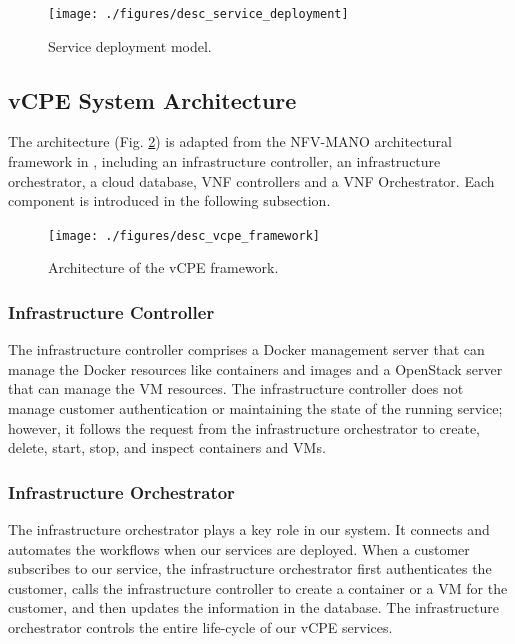 \documentclass[conference]{IEEEtran}
\begin{document}
\begin{figure}[!t]
\centering
\texttt{[image: ./figures/desc\_service\_deployment]}
\caption{Service deployment model.}
\label{fig:desc_service_deployment}
\end{figure}

\subsection{vCPE System Architecture}
The architecture (Fig. \ref{fig:desc_vcpe_framework}) is adapted from the NFV-MANO architectural framework in \cite{nfv2014-v111}, including an infrastructure controller, an infrastructure orchestrator, a cloud database, VNF controllers and a VNF Orchestrator. Each component is introduced in the following subsection.

\begin{figure}[!t]
\centering
\texttt{[image: ./figures/desc\_vcpe\_framework]}
\caption{Architecture of the vCPE framework.}
\label{fig:desc_vcpe_framework}
\end{figure}

\subsubsection{Infrastructure Controller}

The infrastructure controller comprises a Docker management server that can manage the Docker resources like containers and images and a OpenStack server that can manage the VM resources. The infrastructure controller does not manage customer authentication or maintaining the state of the running service; however, it follows the request from the infrastructure orchestrator to create, delete, start, stop, and inspect containers and VMs.

\subsubsection{Infrastructure Orchestrator}

The infrastructure orchestrator plays a key role in our system. It connects and automates the workflows when our services are deployed. When a customer subscribes to our service, the infrastructure orchestrator first authenticates the customer, calls the infrastructure controller to create a container or a VM for the customer, and then updates the information in the database. The infrastructure orchestrator controls the entire life-cycle of our vCPE services.
\end{document}

